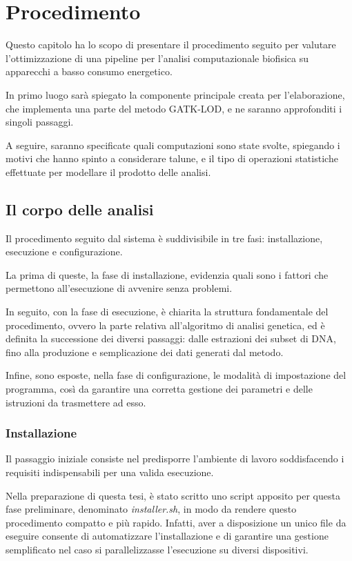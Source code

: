 \chapter{Procedimento}
Questo capitolo ha lo scopo di presentare il procedimento seguito per valutare l'ottimizzazione di una pipeline per l'analisi computazionale biofisica su apparecchi a basso consumo energetico.


In primo luogo sarà spiegato la componente principale creata per l'elaborazione, che implementa una parte del metodo GATK-LOD, e ne saranno approfonditi i singoli passaggi.

A seguire, saranno specificate quali computazioni sono state svolte, spiegando i motivi che hanno spinto a considerare talune, e il tipo di operazioni statistiche effettuate per modellare il prodotto delle analisi.



\section{Il corpo delle analisi}
Il procedimento seguito dal sistema è suddivisibile in tre fasi: installazione, esecuzione e configurazione.


La prima di queste, la fase di installazione, evidenzia quali sono i fattori che permettono all'esecuzione di avvenire senza problemi.


In seguito, con la fase di esecuzione, è chiarita la struttura fondamentale del procedimento, ovvero la parte relativa all'algoritmo di analisi genetica, ed è definita la successione dei diversi passaggi: dalle estrazioni dei subset di DNA, fino alla produzione e semplicazione dei dati generati dal metodo.


Infine, sono esposte, nella fase di configurazione, le modalità di impostazione del programma, così da garantire una corretta gestione dei parametri e delle istruzioni da trasmettere ad esso.


\subsection{Installazione}
Il passaggio iniziale consiste nel predisporre l'ambiente di lavoro soddisfacendo i requisiti indispensabili per una valida esecuzione.

Nella preparazione di questa tesi, è stato scritto uno script apposito per questa fase preliminare, denominato \textit{installer.sh}, in modo da rendere questo procedimento compatto e più rapido.
Infatti, aver a disposizione un unico file da eseguire consente di automatizzare l'installazione e di garantire una gestione semplificato nel caso si parallelizzasse l'esecuzione su diversi dispositivi.

